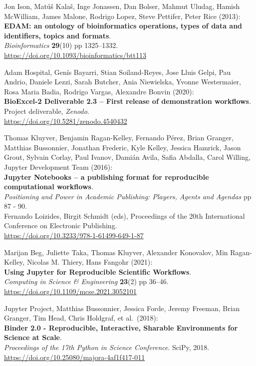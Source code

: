 \begin{thebibliography}{9}
Jon Ison, Matúš Kalaš, Inge Jonassen, Dan Bolser, Mahmut
Uludag, Hamish McWilliam, James Malone, Rodrigo Lopez, Steve Pettifer,
Peter Rice (2013):\\
\textbf{EDAM: an ontology of bioinformatics operations, types of data
and identifiers, topics and formats}.\\
\emph{Bioinformatics} \textbf{29}(10) pp 1325--1332.\\
\url{https://doi.org/10.1093/bioinformatics/btt113}

Adam Hospital, Genís Bayarri, Stian Soiland-Reyes, Jose Lluis
Gelpi, Pau Andrio, Daniele Lezzi, Sarah Butcher, Ania Niewielska, Yvonne
Westermaier, Rosa Maria Badia, Rodrigo Vargas, Alexandre Bonvin
(2020):\\
\textbf{BioExcel-2 Deliverable 2.3 -- First release of demonstration
workflows}.\\
Project deliverable, \emph{Zenodo}.\\
\url{https://doi.org/10.5281/zenodo.4540432}

Thomas Kluyver, Benjamin Ragan-Kelley, Fernando Pérez, Brian
Granger, Matthias Bussonnier, Jonathan Frederic, Kyle Kelley, Jessica
Hamrick, Jason Grout, Sylvain Corlay, Paul Ivanov, Damián Avila, Safia
Abdalla, Carol Willing, Jupyter Development Team (2016):\\
\textbf{Jupyter Notebooks -- a publishing format for reproducible
computational workflows}.\\
\emph{Positioning and Power in Academic Publishing: Players, Agents and Agendas} pp 87 - 90. \\
Fernando Loizides, Birgit Schmidt (eds), Proceedings of the 20th International Conference on Electronic Publishing.\\
\url{https://doi.org/10.3233/978-1-61499-649-1-87}

Marijan Beg, Juliette Taka, Thomas Kluyver, Alexander
Konovalov, Min Ragan-Kelley, Nicolas M. Thiery, Hans Fangohr (2021):\\
\textbf{Using Jupyter for Reproducible Scientific Workflows}.\\
\emph{Computing in Science \& Engineering} \textbf{23}(2) pp 36--46.\\
\url{https://doi.org/10.1109/mcse.2021.3052101}

Jupyter Project, Matthias Bussonnier, Jessica Forde, Jeremy
Freeman, Brian Granger, Tim Head, Chris Holdgraf, et al.~(2018):\\
\textbf{Binder 2.0 - Reproducible, Interactive, Sharable Environments
for Science at Scale}.\\
\emph{Proceedings of the 17th Python in Science
Conference}. SciPy, 2018.\\
\url{https://doi.org/10.25080/majora-4af1f417-011}


\end{thebibliography}
